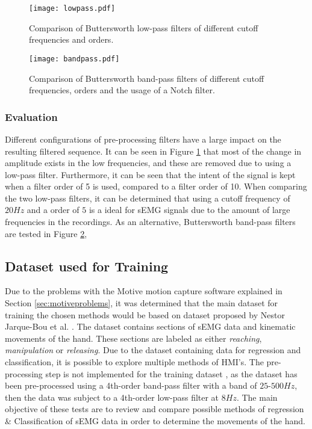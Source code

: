 \documentclass[../main.tex]{subfiles}
\begin{document}
\begin{figure}[H]
\begin{center}
\texttt{[image: lowpass.pdf]}
\caption{Comparison of Buttersworth low-pass filters of different cutoff frequencies and orders.}
\label{fig:lowpass}
\end{center}
\end{figure}
\begin{figure}[H]
\begin{center}
\texttt{[image: bandpass.pdf]}
\caption{Comparison of Buttersworth band-pass filters of different cutoff frequencies, orders and the usage of a Notch filter.}
\label{fig:bandpass}
\end{center}
\end{figure}

\subsubsection{Evaluation}

Different configurations of pre-processing filters have a large impact on the resulting filtered sequence. 
It can be seen in Figure \ref{fig:lowpass} that most of the change in amplitude exists in the low frequencies, and these are removed due to using a low-pass filter.
Furthermore, it can be seen that the intent of the signal is kept when a filter order of 5 is used, compared to a filter order of 10.
When comparing the two low-pass filters, it can be determined that using a cutoff frequency of $20Hz$ and a order of $5$ is a ideal for \gls{sEMG} signals due to the amount of large frequencies in the recordings.
As an alternative, Buttersworth band-pass filters are tested in Figure \ref{fig:bandpass},

\subsection{Dataset used for Training}

Due to the problems with the Motive motion capture software \cite{motive} explained in Section \ref{sec:motiveproblems}, it was determined that the main dataset for training the chosen methods would be based on dataset \cite{kinmusdataset} proposed by Nestor Jarque-Bou et al. \cite{jarque2019}.
The dataset contains sections of \gls{sEMG} data and kinematic movements of the hand.
These sections are labeled as either \textit{reaching}, \textit{manipulation} or \textit{releasing}.  
Due to the dataset containing data for regression and classification, it is possible to explore multiple methods of \gls{HMI}'s. 
The pre-processing step is not implemented for the training dataset \cite{kinmusdataset}, as the dataset has been pre-processed using a 4th-order band-pass filter with a band of  $25$-$500Hz$, then the data was subject to a 4th-order low-pass filter at $8 Hz$.
The main objective of these tests are to review and compare possible methods of regression \& Classification of \gls{sEMG} data in order to determine the movements of the hand.
\end{document}

